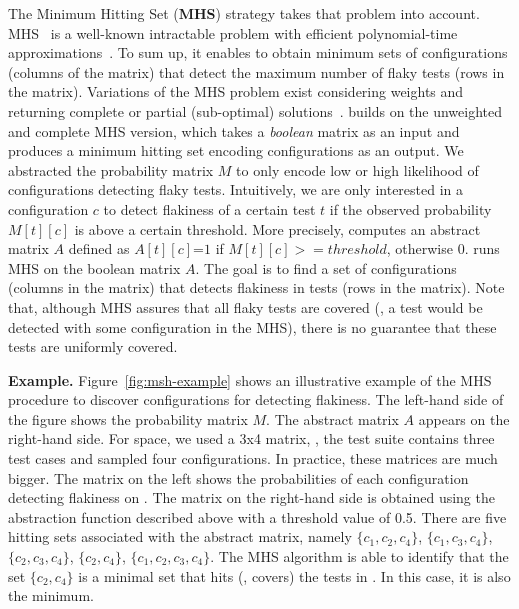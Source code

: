 \documentclass[conference]{IEEEtran}
\begin{document}
The Minimum Hitting Set (\textbf{MHS}) strategy takes that problem into account. MHS~\cite{10.1145/1150334.1150336} is a well-known intractable problem with efficient polynomial-time approximations~\cite{DBLP:journals/corr/Gainer-DewarV16}. To sum up, it enables \tname{} to obtain minimum sets of configurations (columns of the matrix) that detect the maximum number of flaky tests (rows in the matrix). Variations of the MHS problem exist considering weights and returning complete or partial (sub-optimal) solutions~\cite{seedselect}. \tname{} builds on the unweighted and complete MHS version, which takes a \emph{boolean} matrix as an input and produces a minimum hitting set encoding configurations as an output. We abstracted the probability matrix $M$ to only encode low or high likelihood of configurations detecting flaky tests. Intuitively, we are only interested in a configuration $c$ to detect flakiness of a certain test $t$ if the observed probability $M[t][c]$ is above a certain threshold. More precisely, \tname{} computes an abstract matrix $A$ defined as $A[t][c]$=$1$ if $M[t][c]>=\mathit{threshold}$, otherwise $0$. \tname{} runs MHS on the boolean matrix $A$. The goal is to find a set of configurations (columns in the matrix) that detects flakiness in tests (rows in the matrix). Note that, although MHS assures that all flaky tests are covered (\ie{}, a test would be detected with some configuration in the MHS), there is no guarantee that these tests are uniformly covered.

\vspace{1ex}\noindent\textbf{Example.} Figure~\ref{fig:msh-example} shows an illustrative example of the MHS procedure to discover configurations for detecting flakiness. The left-hand side of the figure shows the probability matrix $M$. The abstract matrix $A$ appears on the right-hand side. For space, we used a 3x4 matrix, \ie{}, the test suite contains three test cases and \tname{} sampled four configurations. In practice, these matrices are much bigger. The matrix on the left shows the probabilities of each configuration detecting flakiness on \tr. The matrix on the right-hand side is obtained using the abstraction function described above with a threshold value of 0.5. There are five hitting sets associated with the abstract matrix, namely $\{c_1, c_2, c_4\}$, $\{c_1, c_3, c_4\}$, $\{c_2, c_3, c_4\}$, $\{c_2, c_4\}$, $\{c_1, c_2, c_3, c_4\}$. The MHS algorithm is able to identify that the set $\{c_2, c_4\}$ is a minimal set that hits (\ie{}, covers) the tests in \tr. In this case, it is also the minimum.
\end{document}
